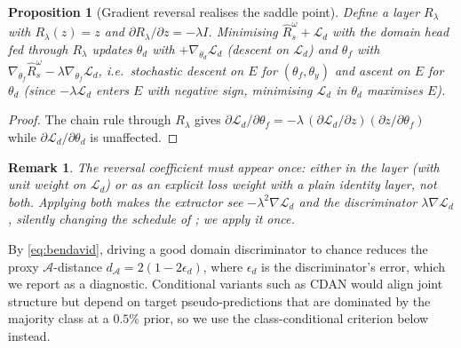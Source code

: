 \documentclass[journal]{IEEEtran}
\newtheorem{proposition}{Proposition}
\newtheorem{remark}{Remark}
\newcommand{\1}{\mathbf{1}}
\begin{document}
\begin{proposition}[Gradient reversal realises the saddle point]\label{prop:grl}
Define a layer $R_\lambda$ with $R_\lambda(z)=z$ and $\partial R_\lambda/\partial z=-\lambda I$. Minimising $\hat R_s^\omega+\mathcal L_d$ with the domain head fed through $R_\lambda$ updates $\theta_d$ with $+\nabla_{\theta_d}\mathcal L_d$ (descent on $\mathcal L_d$) and $\theta_f$ with $\nabla_{\theta_f}\hat R_s^\omega-\lambda\nabla_{\theta_f}\mathcal L_d$, i.e.\ stochastic descent on $E$ for $(\theta_f,\theta_y)$ and ascent on $E$ for $\theta_d$ (since $-\lambda\mathcal L_d$ enters $E$ with negative sign, minimising $\mathcal L_d$ in $\theta_d$ maximises $E$).
\end{proposition}
\begin{proof}
The chain rule through $R_\lambda$ gives $\partial\mathcal L_d/\partial\theta_f=-\lambda\,(\partial\mathcal L_d/\partial z)(\partial z/\partial\theta_f)$ while $\partial\mathcal L_d/\partial\theta_d$ is unaffected. \end{proof}
\begin{remark}
The reversal coefficient must appear \emph{once}: either in the layer (with unit weight on $\mathcal L_d$) or as an explicit loss weight with a plain identity layer, not both. Applying both makes the extractor see $-\lambda^2\nabla\mathcal L_d$ and the discriminator $\lambda\nabla\mathcal L_d$, silently changing the schedule of \cite{ganin2016dann}; we apply it once.\end{remark}

By \eqref{eq:bendavid}, driving a good domain discriminator to chance reduces the proxy $\mathcal A$-distance $d_{\mathcal A}=2(1-2\epsilon_d)$, where $\epsilon_d$ is the discriminator's error, which we report as a diagnostic. Conditional variants such as CDAN \cite{long2018cdan} would align joint structure but depend on target pseudo-predictions that are dominated by the majority class at a $0.5\%$ prior, so we use the class-conditional criterion below instead.
\end{document}

